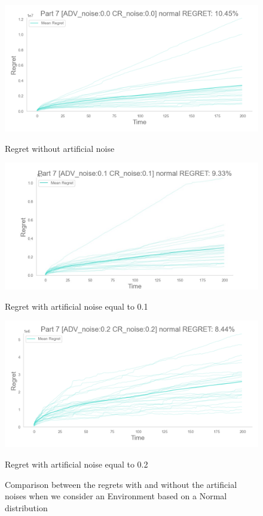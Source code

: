 \begin{figure}[!htb]
    \centering

    \includegraphics[width=\linewidth]{images/part7_normal_regret_noise00.png}
    \caption{Regret without artificial noise}
    \endminipage\hfill
    \includegraphics[width=\linewidth]{images/part7_normal_regret_noise01.jpeg}
    \caption{Regret with artificial noise equal to 0.1}
    \endminipage\hfill
    \includegraphics[width=\linewidth]{images/part7_normal_regret_noise02.png}
    \caption{Regret with artificial noise equal to 0.2}
    \endminipage\hfill

	\label{RegretPart7Normal}    
    \caption{Comparison between the regrets with and without the artificial noises when we consider an Environment based on a Normal distribution}
\end{figure}